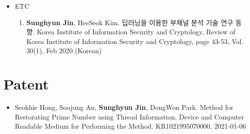 \documentclass[a4paper,20pt]{article}
\begin{document}
\begin{itemize}
    \item {ETC}
        \vspace{-6pt}
        \begin{enumerate}
            \item {\textbf{Sunghyun Jin}, HeeSeok Kim. 딥러닝을 이용한 부채널 분석 기술 연구 동향. Korea Institute of Information Security and Cryptology, Review of Korea Institute of Information Security and Cryptology, page 43-53, Vol. 30(1), Feb 2020 (Korean)}
            \vspace{-2pt}
        \end{enumerate}
\end{itemize}



\section{\textbf{Patent}}
\begin{itemize}
    \item {Seokhie Hong, Soojung An, \textbf{Sunghyun Jin}, DongWon Park. Method for Restorating Prime Number using Thread Information, Device and Computer Readable Medium for Performing the Method. KR1021995070000, 2021-01-06}
\end{itemize}



\iffalse
\section{\textbf{Project}}
\item {Work in Progress}
    \vspace{-6pt}
    \begin{enumerate}
        \item {blah}
        \vspace{-2pt}
    \end{enumerate}
\begin{itemize}
    \item {blah}
    \vspace{-4pt}
\end{itemize}
\fi



\iffalse
\section{\textbf{Talk}}
    \item {Work in Progress}
        \vspace{-6pt}
        \begin{enumerate}
            \item {blah}
            \vspace{-2pt}
        \end{enumerate}
    \begin{itemize}
        \item {blah}
        \vspace{-4pt}
    \end{itemize}
\fi
\end{document}
